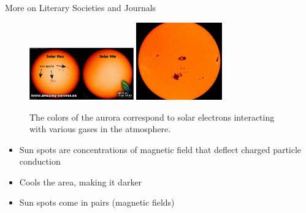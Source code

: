 \documentclass{beamer}
\begin{document}
\begin{frame}{More on Literary Societies and Journals}
\small
\begin{figure}
\includegraphics[width=0.4\textwidth]{figures/solar-max.jpg}
\includegraphics[width=0.33\textwidth]{figures/spot.jpg}
\caption{The colors of the aurora correspond to solar electrons interacting with various gases in the atmosphere.}
\end{figure}
\begin{itemize}
\item Sun spots are concentrations of magnetic field that deflect charged particle conduction
\item Cools the area, making it darker
\item Sun spots come in pairs (magnetic fields)
\end{itemize}
\end{frame}
\end{document}
